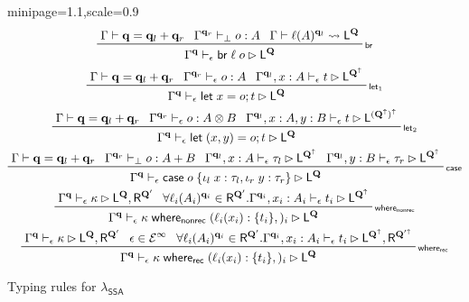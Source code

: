 \documentclass[acmsmall,screen,anonymous,review]{acmart}
\newcommand{\mc}[1]{\ensuremath{\mathcal{#1}}}
\newcommand{\mb}[1]{\ensuremath{\mathbf{#1}}}
\newcommand{\ms}[1]{\ensuremath{\mathsf{#1}}}
\newcommand{\lto}{:}
\newcommand{\linl}[1]{\iota_l\;{#1}}
\newcommand{\linr}[1]{\iota_r\;{#1}}
\newcommand{\letstmt}[3]{\ensuremath{\ms{let}\;#1 = #2; #3}}
\newcommand{\brb}[2]{\ms{br}\;#1\;#2}
\newcommand{\casestmt}[5]{\ms{case}\;#1\;\{\linl{#2} \lto #3, \linr{#4} \lto #5\}}
\newcommand{\awhere}[2]{#1\;\ms{where}_{\ms{nonrec}}\;#2}
\newcommand{\cwhere}[2]{#1\;\ms{where}_{\ms{rec}}\;#2}
\newcommand{\wbranch}[3]{#1(#2) \lto \{#3\}}
\newcommand{\einf}[1]{#1 \in \mc{E}^\infty}
\newcommand{\qsp}[4]{#1 \vdash #2 = #3 + #4}
\newcommand{\lwk}[3]{#1 \vdash #2 \rightsquigarrow #3}
\newcommand{\lhyp}[2]{#1(#2)}
\newcommand{\rle}[1]{{\scriptsize\textsf{#1}}}
\newcommand{\hasty}[4]{#1 \vdash_{#2} #3: {#4}}
\newcommand{\haslb}[4]{#1 \vdash_{#2} #3 \rhd #4}
\newcommand{\isotopessa}{\(\lambda_{\ms{SSA}}\)}
\newcommand{\zeroqv}[1]{#1^\uparrow}
\begin{document}
\begin{figure}
  \begin{adjustbox}{minipage=1.1\textwidth,scale=0.9}
  \begin{gather*}
    \prftree[r]{\rle{br}}
      {\qsp{\Gamma}{\mb{q}}{\mb{q}_l}{\mb{q}_r}}
      {\hasty{\Gamma^{\mb{q}_r}}{\bot}{o}{A}}
      {\lwk{\Gamma}{\lhyp{\ell}{A}^{\mb{q}_l}}{\ms{L}^{\mb{Q}}}}
      {\haslb{\Gamma^{\mb{q}}}{\epsilon}{\brb{\ell}{o}}{\ms{L}^{\mb{Q}}}}
    \\
    \prftree[r]{\rle{let$_1$}}
      {\qsp{\Gamma}{\mb{q}}{\mb{q}_l}{\mb{q}_r}}
      {\hasty{\Gamma^{\mb{q}_r}}{\epsilon}{o}{A}}
      {\haslb{\Gamma^{\mb{q}_l}, x : A}{\epsilon}{t}{\ms{L}^{\zeroqv{\mb{Q}}}}}
      {\haslb{\Gamma^{\mb{q}}}{\epsilon}{\letstmt{x}{o}{t}}{\ms{L}^{\mb{Q}}}}
    \\
    \prftree[r]{\rle{let$_2$}}
      {\qsp{\Gamma}{\mb{q}}{\mb{q}_l}{\mb{q}_r}}
      {\hasty{\Gamma^{\mb{q}_r}}{\epsilon}{o}{A \otimes B}}
      {\haslb{\Gamma^{\mb{q}_l}, x : A, y : B}{\epsilon}{t}
        {\ms{L}^{\zeroqv{(\zeroqv{\mb{Q}})}}}}
      {\haslb{\Gamma^{\mb{q}}}{\epsilon}{\letstmt{(x, y)}{o}{t}}{\ms{L}^{\mb{Q}}}}
    \\
    \prftree[r]{\rle{case}}
      {\qsp{\Gamma}{\mb{q}}{\mb{q}_l}{\mb{q}_r}}
      {\hasty{\Gamma^{\mb{q}_r}}{\bot}{o}{A + B}}
      {\haslb{\Gamma^{\mb{q}_l}, x : A}{\epsilon}{\tau_l}
        {\ms{L}^{\zeroqv{\mb{Q}}}}}
      {\haslb{\Gamma^{\mb{q}_l}, y : B}{\epsilon}{\tau_r}
        {\ms{L}^{\zeroqv{\mb{Q}}}}}
      {\haslb{\Gamma^{\mb{q}}}{\epsilon}{\casestmt{o}{x}{\tau_l}{y}{\tau_r}}
                                                {\ms{L}^{\mb{Q}}}}
    \\
    \prftree[r]{\rle{where$_{\ms{nonrec}}$}}
      {\haslb{\Gamma^{\mb{q}}}{\epsilon}{\kappa}
        {\ms{L}^{\mb{Q}}, \ms{R}^{\mb{Q}'}}}
      {\forall \lhyp{\ell_i}{A_i}^{\mb{q}_i} \in \ms{R}^{\mb{Q}'} .
        \haslb{\Gamma^{\mb{q}_i}, x_i : A_i}{\epsilon}{t_i}{\ms{L}^{\zeroqv{\mb{Q}}}}
      }
      {\haslb{\Gamma^{\mb{q}}}{\epsilon}{\awhere{\kappa}{(\wbranch{\ell_i}{x_i}{t_i},)_i}}
        {\ms{L}^{\mb{Q}}}}
    \\
    \prftree[r]{\rle{where$_{\ms{rec}}$}}
    {\haslb{\Gamma^{\mb{q}}}{\epsilon}{\kappa}
      {\ms{L}^{\mb{Q}}, \ms{R}^{\mb{Q}'}}}
    {\einf{\epsilon}}
    {\forall \lhyp{\ell_i}{A_i}^{\mb{q}_i} \in \ms{R}^{\mb{Q}'} .
      \haslb{\Gamma^{\mb{q}_i}, x_i : A_i}{\epsilon}{t_i}{
        \ms{L}^{\zeroqv{\mb{Q}}}, \ms{R}^{\zeroqv{\mb{Q}'}}}
    }
    {\haslb{\Gamma^{\mb{q}}}{\epsilon}{\cwhere{\kappa}{(\wbranch{\ell_i}{x_i}{t_i},)_i}}
      {\ms{L}^{\mb{Q}}}}
  \end{gather*}
  \end{adjustbox}
  \caption{Typing rules for \isotopessa{}}
  \Description{}
  \label{fig:ssa-typing}
\end{figure}
\end{document}
